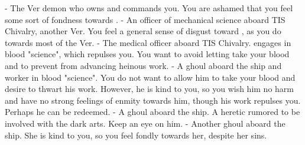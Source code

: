 \documentclass[char]{guildcamp4}
\begin{document}
\begin{contacts}
	\contact{\cVone{}} - The Ver demon who owns and commands you. You are ashamed that you feel some sort of fondness towards \cVone{\them}.
	\contact{\cVtwo{}} - An officer of mechanical science aboard TIS Chivalry, another Ver. You feel a general sense of disgust toward \cVtwo{\them}, as you do towards most of the Ver.
	\contact{\cVthree{}} - The medical officer aboard TIS Chivalry. \cVthree{\They} engages in blood "science", which repulses you. You want to avoid letting \cVthree{\them} take your blood and to prevent \cVthree{\them} from advancing \cVthree{\their} heinous work.
	\contact{\cJames{}} - A ghoul aboard the ship and worker in blood "science". You do not want to allow him to take your blood and desire to thwart his work. However, he is kind to you, so you wish him no harm and have no strong feelings of enmity towards him, though his work repulses you. Perhaps he can be redeemed.
	\contact{\cRasputin{}} - A ghoul aboard the ship. A heretic rumored to be involved with the dark arts. Keep an eye on him.  
	\contact{\cJulie{}} - Another ghoul aboard the ship. She is kind to you, so you feel fondly towards her, despite her sins. 
\end{contacts}

\end{document}
